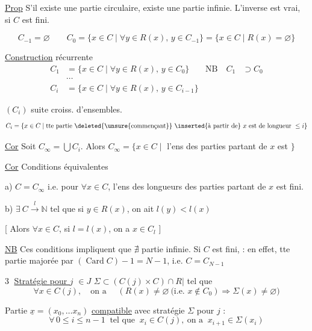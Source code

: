 \uline{Prop} S'il existe une partie circulaire, existe une partie infinie. L'inverse est vrai, si $C$ est fini.

\[
C_{-1}=\varnothing\qquad C_0=\{x\in C\mid\forall y\in R(x),\,y\in C_{-1}\}=\{x\in C\mid R(x)=\varnothing\}
\]

\uline{Construction} récurrente
\[
\begin{aligned}
C_1&=\{x\in C\mid\forall y\in R(x),\,y\in C_0\} & \text{NB}\quad C_1&\supset C_0\\
&\cdots\\
C_i&=\{x\in C\mid\forall y\in R(x),\,y\in C_{i-1}\}
\end{aligned}
\]

\uline{} \quad $(C_i)$  suite croiss.  d'ensembles.
\[
C_i=\{x\in C\mid\text{tte partie \deleted{\unsure{commençant}} \inserted{à partir de} }x\text{ est de longueur }\leq i\}
\]

\uline{Cor} Soit $C_\infty=\bigcup C_i$. Alors $C_\infty=\{x\in C\mid{}$ l'ens des  parties partant de $x$ est $\}$

\uline{Cor} \quad Conditions équivalentes

a) $C=C_\infty$ i.e. pour $\forall x\in C$, l'ens des longueurs des parties partant de $x$ est fini.

b) $\exists\ C\xrightarrow{l}\mathbb N$ tel que si $y\in R(x)$, on ait $l(y)<l(x)$

[ Alors $\forall x\in C$, si $l=l(x)$, on a $x\in C_l$ ]


\uline{NB} Ces conditions impliquent que $\nexists$ partie infinie.  Si $C$ est fini,   : en effet, tte partie   majorée  par $(\operatorname{Card} C)-1=N-1$, i.e. $C=C_{N-1}$


\textcircled{3} \uline{Stratégie pour $j$} $\in J$ \quad $\Sigma\subset(C(j)\times C)\cap R\big|$ tel que
\[
\forall x\in C(j),\quad\text{on a }\quad(R(x)\ne\varnothing\ \text{(i.e. }x\notin C_0)\Longrightarrow\Sigma(x)\ne\varnothing)
\]

Partie $\underline{x}=(x_0,\ldots x_n)$ \uline{compatible} avec stratégie $\Sigma$ pour $j$ :
\[
\forall\,0\leq i\leq n-1\ \text{ tel que }\ x_i\in C(j),\ \text{on a }\ x_{i+1}\in\Sigma(x_i)
\]

